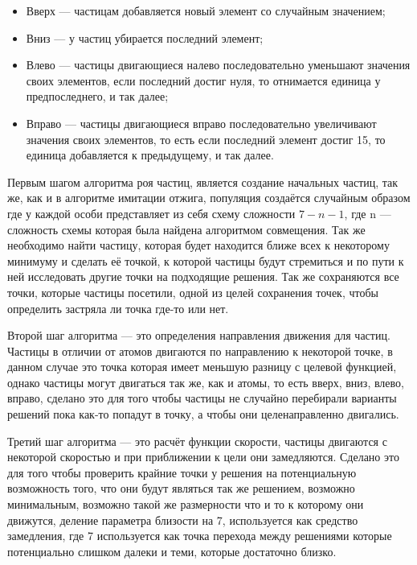 \documentclass[14pt]{extarticle} %
\begin{document}
\begin{itemize}
	\item Вверх --- частицам добавляется новый элемент со случайным значением;
	\item Вниз --- у частиц убирается последний элемент;
	\item Влево --- частицы двигающиеся налево последовательно уменьшают значения своих элементов, если последний достиг нуля, то отнимается единица у предпоследнего, и так далее; 
	\item Вправо --- частицы двигающиеся вправо последовательно увеличивают значения своих элементов, то есть если последний элемент достиг 15, то единица добавляется к предыдущему, и так далее.
\end{itemize}

Первым шагом алгоритма роя частиц, является создание начальных частиц, так же, как и в алгоритме имитации отжига, популяция создаётся случайным образом где у каждой особи представляет из себя схему сложности $7-n-1$, где n --- сложность схемы которая была найдена алгоритмом совмещения. Так же необходимо найти частицу, которая будет находится ближе всех к некоторому минимуму и сделать её точкой, к которой частицы будут стремиться и по пути к ней исследовать другие точки на подходящие решения. Так же сохраняются все точки, которые частицы посетили, одной из целей сохранения точек, чтобы определить застряла ли точка где-то или нет.\par
Второй шаг алгоритма --- это определения направления движения для частиц. Частицы в отличии от атомов двигаются по направлению к некоторой точке, в данном случае это точка которая имеет меньшую разницу с целевой функцией, однако частицы могут двигаться так же, как и атомы, то есть вверх, вниз, влево, вправо, сделано это для того чтобы частицы не случайно перебирали варианты решений пока как-то попадут в точку, а чтобы они целенаправленно двигались.
\par

\nocite{matplotlib}
\nocite{dec}
\nocite{class}
\nocite{list}
Третий шаг алгоритма --- это расчёт функции скорости, частицы двигаются с некоторой скоростью и при приближении к цели они замедляются. Сделано это для того чтобы проверить крайние точки у решения на потенциальную возможность того, что они будут являться так же решением, возможно минимальным, возможно такой же размерности что и то к которому они движутся, деление параметра близости на 7, используется как средство замедления, где 7 используется как точка перехода между решениями которые потенциально слишком далеки и теми, которые достаточно близко.
\end{document}
